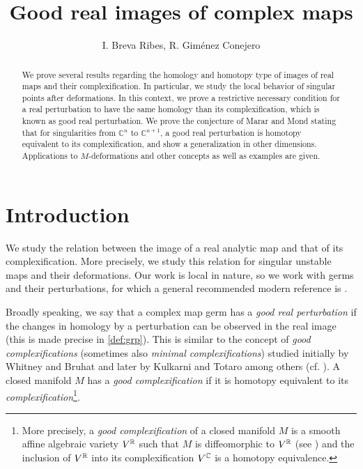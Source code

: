 \documentclass[a4paper,12pt]{amsart}
\begin{document}
\author{I. Breva Ribes, R. Giménez Conejero}
\title[Good real images of complex maps]{Good real images of complex maps}

\address{Departament de Matemátiques,
Universitat de Val\`encia, Campus de Burjassot, 46100 Burjassot
Spain
\newline
Mid Sweden University, Sidsjövägen 2, 852 33 Sundsvall,
Sweden
}
%

 


\begin{abstract}
    We prove several results regarding the homology and homotopy type of images of real maps and their complexification. In particular, we study the local behavior of singular points after deformations. In this context, we prove a restrictive necessary condition for a real perturbation to have the same homology than its complexification, which is known as good real perturbation. We prove the conjecture of Marar and Mond stating that for singularities from $\mathbb{C}^n$ to $\mathbb{C}^{n+1}$, a good real perturbation is homotopy equivalent to its complexification, and show a generalization in other dimensions. Applications to $M$-deformations and other concepts as well as examples are given.
\end{abstract}


\maketitle

\section{Introduction}

We study the relation between the image of a real analytic map and that of its complexification. More precisely, we study this relation for singular unstable maps and their deformations.  Our work is local in nature, so we work with germs and their perturbations, for which a general recommended modern reference is \cite{Mond2020}.

Broadly speaking, we say that a complex map germ has a \textsl{good real perturbation} if the changes in homology by a perturbation can be observed in the real image (this is made precise in \cref{def:grp}). This is similar to the concept of \textsl{good complexifications} (sometimes also \textsl{minimal complexifications}) studied initially by Whitney and Bruhat \cite{Whitney1959} and later by Kulkarni \cite{Kulkarni1978} and Totaro \cite{Totaro2003} among others (cf. \cite{Biswas2016,Biswas2015}). A closed manifold $M$ has a \textsl{good complexification} if it is homotopy equivalent to its \textsl{complexification}\footnote{More precisely, a \textit{good complexification} of a closed manifold $M$ is a smooth affine algebraic variety $V^{\mathbb{R}}$ such that $M$ is diffeomorphic to $V^{\mathbb{R}}$ (see \cite{Tognoli1973}) and the inclusion of $V^{\mathbb{R}}$ into its complexification $V^{\mathbb{C}}$ is a homotopy equivalence.}.
\end{document}
